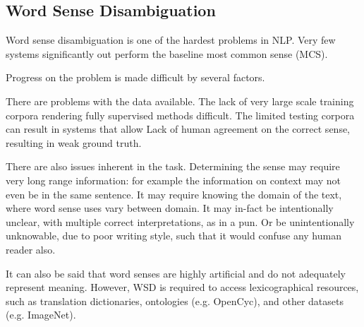 \documentclass[12pt,parskip]{komatufte}
\begin{document}
\subsection{Word Sense Disambiguation}





Word sense disambiguation is one of the hardest problems in NLP.
Very few systems significantly out perform the baseline most common sense (MCS).

Progress on the problem is made difficult by several factors.

There are problems with the data available.
The lack of very large scale training corpora rendering fully supervised methods difficult.
The limited testing corpora can result in systems that allow 
Lack of human agreement on the correct sense, resulting in weak ground truth.

There are also issues inherent in the task.
Determining the sense may require very long range information:
for example the information on context may not even be in the same sentence.
It may require knowing the domain of the text, where word sense uses vary between domain.
It may in-fact be intentionally unclear, with multiple correct interpretations, as in a pun.
Or be unintentionally unknowable, due to poor writing style, such that it would confuse any human reader also.


It can also be said that word senses are highly artificial and do not adequately represent meaning.
However, WSD is required to access lexicographical resources,
such as translation dictionaries, ontologies (e.g. OpenCyc), and other datasets (e.g. ImageNet).
\end{document}
